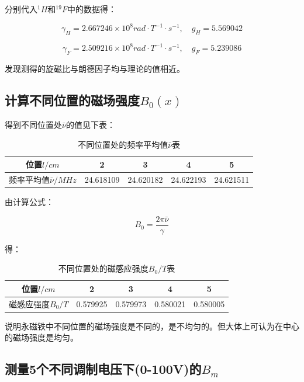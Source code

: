 \documentclass[a4paper,UTF8]{ctexart}
\begin{document}
分别代入$^1H$和$^{19}F$中的数据得：

\begin{equation}
    \gamma_H = 2.667246\times 10^8 rad \cdot T^{-1}\cdot s^{-1}, \quad g_H = 5.569042
\end{equation}

\begin{equation}
    \gamma_F = 2.509216\times 10^8 rad \cdot T^{-1}\cdot s^{-1}, \quad g_F = 5.239086
\end{equation}

发现测得的旋磁比与朗德因子均与理论的值相近。

\subsection{计算不同位置的磁场强度$B_0(x)$}

得到不同位置处$\bar{\nu}$的值见下表：

\begin{table}[H]
    \centering
    \begin{tabular}{|c|c|c|c|c|}
    \hline
        位置$l/cm$ & 2 & 3 & 4 & 5 \\ \hline
        频率平均值$\bar{\nu}/MHz$ & 24.618109 & 24.620182 & 24.622193 & 24.621511 \\ \hline
    \end{tabular}
    \caption{不同位置处的频率平均值$\bar{\nu}$表}
\end{table}

由计算公式：

\begin{equation}
    B_0 = \frac{2\pi \bar{\nu}}{\gamma}
\end{equation}

得：

\begin{table}[H]
    \centering
    \begin{tabular}{|c|c|c|c|c|}
    \hline
        位置$l/cm$ & 2 & 3 & 4 & 5 \\ \hline
        磁感应强度$B_0/T$ & 0.579925 & 0.579973 & 0.580021 & 0.580005 \\ \hline
    \end{tabular}
    \caption{不同位置处的磁感应强度$B_0/T$表}
\end{table}

说明永磁铁中不同位置的磁场强度是不同的，是不均匀的。但大体上可认为在中心的磁场强度是均匀。

\subsection{测量5个不同调制电压下(0-100V)的$B_m$}
\end{document}
